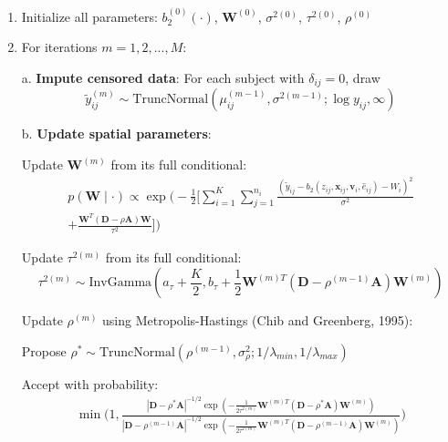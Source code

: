 \documentclass[useAMS,referee]{biom}
\begin{document}
\begin{enumerate}
\item Initialize all parameters: $b_2^{(0)}(\cdot)$, $\mathbf{W}^{(0)}$, $\sigma^{2(0)}$, $\tau^{2(0)}$, $\rho^{(0)}$
   
\item For iterations $m = 1, 2, ..., M$:

   a. \textbf{Impute censored data}: For each subject with $\delta_{ij} = 0$, draw
      \begin{equation}
      \tilde{y}_{ij}^{(m)} \sim \text{TruncNormal}(\mu_{ij}^{(m-1)}, \sigma^{2(m-1)}; \log y_{ij}, \infty)
      \end{equation}
   
   b. \textbf{Update spatial parameters}:
      
      Update $\mathbf{W}^{(m)}$ from its full conditional:
      \begin{equation}
      \begin{split}
      p(\mathbf{W} \mid \cdot) \propto \exp\biggl(-\frac{1}{2}\biggl[\sum_{i=1}^K\sum_{j=1}^{n_i} \frac{(\tilde{y}_{ij} - b_2(z_{ij}, \mathbf{x}_{ij}, \mathbf{v}_i, \hat{e}_{ij}) - W_i)^2}{\sigma^2} \\
      + \frac{\mathbf{W}^T(\mathbf{D} - \rho\mathbf{A})\mathbf{W}}{\tau^2}\biggr]\biggr)
      \end{split}
      \end{equation}
      
      Update $\tau^{2(m)}$ from its full conditional:
      \begin{equation}
      \tau^{2(m)} \sim \text{InvGamma}\left(a_\tau + \frac{K}{2}, b_\tau + \frac{1}{2}\mathbf{W}^{(m)T}(\mathbf{D} - \rho^{(m-1)}\mathbf{A})\mathbf{W}^{(m)}\right)
      \end{equation}
      
      Update $\rho^{(m)}$ using Metropolis-Hastings (Chib and Greenberg, 1995):
      
      Propose $\rho^* \sim \text{TruncNormal}(\rho^{(m-1)}, \sigma_\rho^2; 1/\lambda_{min}, 1/\lambda_{max})$
      
      Accept with probability:
      \begin{equation}
      \begin{split}
      \min\biggl(1, \frac{|\mathbf{D} - \rho^*\mathbf{A}|^{-1/2}\exp\left(-\frac{1}{2\tau^{2(m)}}\mathbf{W}^{(m)T}(\mathbf{D} - \rho^*\mathbf{A})\mathbf{W}^{(m)}\right)}{|\mathbf{D} - \rho^{(m-1)}\mathbf{A}|^{-1/2}\exp\left(-\frac{1}{2\tau^{2(m)}}\mathbf{W}^{(m)T}(\mathbf{D} - \rho^{(m-1)}\mathbf{A})\mathbf{W}^{(m)}\right)}\biggr)
      \end{split}
      \end{equation}
   

\end{enumerate}
\end{document}
